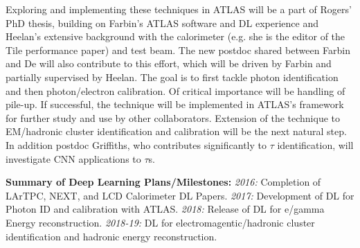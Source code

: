 
Exploring and implementing these techniques in ATLAS will be a part of
Rogers' PhD thesis, building on Farbin's ATLAS software and DL
experience and Heelan's extensive background with the calorimeter
(e.g. she is the editor of the Tile performance paper) and test
beam. The new postdoc shared between Farbin and De will also contribute
to this effort, which will be driven by Farbin and partially
supervised by Heelan.  The goal is to first tackle photon
identification and then photon/electron calibration. Of critical
importance will be handling of pile-up. If successful, the technique
will be implemented in ATLAS's framework for further study and use by
other collaborators. Extension of the technique to EM/hadronic cluster
identification and calibration will be the next natural step. In
addition postdoc Griffiths, who contributes significantly to $\tau$
identification, will investigate CNN applications to $\tau$s.



{\bf Summary of Deep Learning Plans/Milestones:} {\em 2016:}
Completion of LArTPC, NEXT, and LCD Calorimeter DL Papers. {\em 2017:}
Development of DL for Photon ID and calibration with ATLAS. {\em
2018:} Release of DL for e/gamma Energy reconstruction. {\em 2018-19:}
DL for electromagentic/hadronic cluster identification and hadronic
energy reconstruction.





